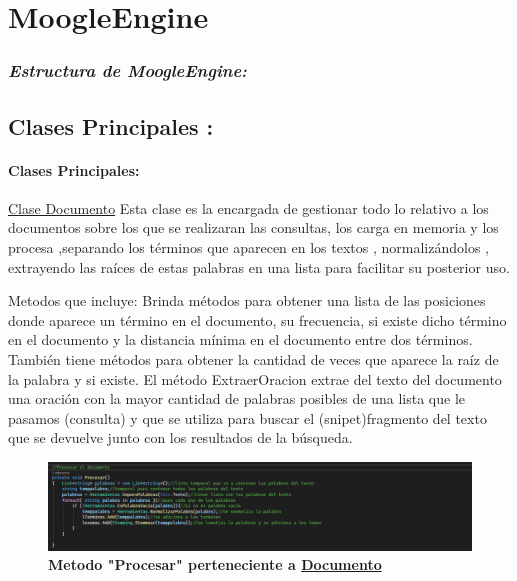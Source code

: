 \section*{MoogleEngine}
    \begin{frame}
        \frametitle{\emph{Estructura de \textbf{MoogleEngine:}}}
    \subsection*{Clases Principales : }
    \framesubtitle{\Large{Clases Principales:}}
        
\begin{block}{\underline{Clase Documento}}
    Esta clase es la encargada de gestionar todo lo relativo a los documentos sobre los que se realizaran las consultas, los carga en memoria y los procesa ,separando los términos que aparecen en los textos , normalizándolos , extrayendo las raíces de estas palabras en una lista para facilitar su posterior uso.

    \begin{beamerboxesrounded}{\color{red}Metodos que incluye:}
        Brinda métodos para obtener una lista de las posiciones donde aparece un término en el documento, su frecuencia, si existe dicho término en el documento y la distancia mínima en el documento entre dos términos. También tiene métodos para obtener la cantidad de veces que aparece la raíz de la palabra y si existe. El método ExtraerOracion extrae del texto del documento una oración con la mayor cantidad de palabras posibles de una lista que le pasamos (consulta) y que se utiliza para buscar el (snipet)fragmento del texto que se devuelve junto con los resultados de la búsqueda.

    \end{beamerboxesrounded}
        
\end{block}
    
    \end{frame}

    \begin{frame}
        \begin{figure}[h]
        \includegraphics[width=200mm]{Imagen1.png}
        \caption{\textbf{Metodo "Procesar" perteneciente a \underline{Documento}}}     
        \end{figure}
    \end{frame}


